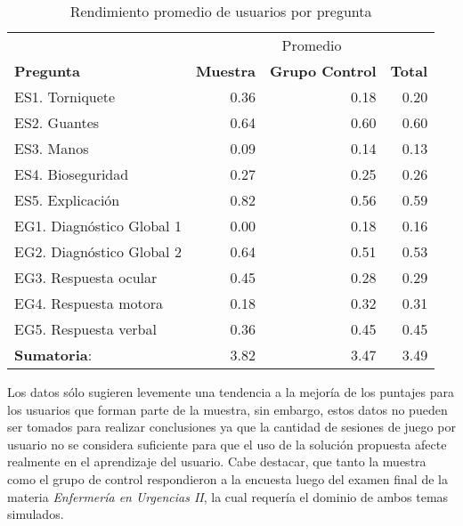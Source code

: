 \begin{table}[H]
\centering
\begin{tabular}{lrrr}
\toprule
& \multicolumn{3}{c}{Promedio} \\
\cmidrule(lr){2-4}
\textbf{Pregunta} & 
\textbf{Muestra} & 
\textbf{Grupo Control} & 
\textbf{Total} \\ 
\midrule
ES1. Torniquete           & 0.36 & 0.18 & 0.20 \\
ES2. Guantes              & 0.64 & 0.60 & 0.60 \\
ES3. Manos                & 0.09 & 0.14 & 0.13 \\
ES4. Bioseguridad         & 0.27 & 0.25 & 0.26 \\
ES5. Explicación          & 0.82 & 0.56 & 0.59 \\
\midrule
EG1. Diagnóstico Global 1 & 0.00 & 0.18 & 0.16 \\
EG2. Diagnóstico Global 2 & 0.64 & 0.51 & 0.53 \\
EG3. Respuesta ocular     & 0.45 & 0.28 & 0.29 \\
EG4. Respuesta motora     & 0.18 & 0.32 & 0.31 \\
EG5. Respuesta verbal     & 0.36 & 0.45 & 0.45 \\
\midrule
\textbf{Sumatoria}: & 3.82 & 3.47 & 3.49  \\
\bottomrule
\end{tabular}
\caption{Rendimiento promedio de usuarios por pregunta}
\label{tab:objetiva_rendimiento_por_pregunta}
\end{table}

Los datos sólo sugieren levemente una tendencia a la mejoría de los puntajes
para los usuarios que forman parte de la muestra, sin embargo, estos datos no
pueden ser tomados para realizar conclusiones ya que la cantidad de sesiones de
juego por usuario no se considera suficiente para que el uso de la solución
propuesta afecte realmente en el aprendizaje del usuario. Cabe destacar, que 
tanto la muestra como el grupo de control respondieron a la encuesta luego del examen 
final de la materia \emph{Enfermería en Urgencias II}, la cual requería el dominio de ambos 
temas simulados.
